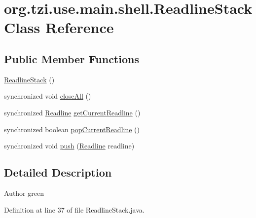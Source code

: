 \hypertarget{classorg_1_1tzi_1_1use_1_1main_1_1shell_1_1_readline_stack}{\section{org.\-tzi.\-use.\-main.\-shell.\-Readline\-Stack Class Reference}
\label{classorg_1_1tzi_1_1use_1_1main_1_1shell_1_1_readline_stack}
}
\subsection*{Public Member Functions}
\begin{DoxyCompactItemize}
\item 
\hyperlink{classorg_1_1tzi_1_1use_1_1main_1_1shell_1_1_readline_stack_a7762349b43ba2d854a9fc03502c673af}{Readline\-Stack} ()
\item 
synchronized void \hyperlink{classorg_1_1tzi_1_1use_1_1main_1_1shell_1_1_readline_stack_a517cc162314a1683865f2d2283bc1b4d}{close\-All} ()
\item 
synchronized \hyperlink{interfaceorg_1_1tzi_1_1use_1_1util_1_1input_1_1_readline}{Readline} \hyperlink{classorg_1_1tzi_1_1use_1_1main_1_1shell_1_1_readline_stack_ada96c1ca20a50243e0e843220d83bc56}{get\-Current\-Readline} ()
\item 
synchronized boolean \hyperlink{classorg_1_1tzi_1_1use_1_1main_1_1shell_1_1_readline_stack_a7775c9ef3731543fc28a3d7b625e299b}{pop\-Current\-Readline} ()
\item 
synchronized void \hyperlink{classorg_1_1tzi_1_1use_1_1main_1_1shell_1_1_readline_stack_acee8c24d05728e09a32f071135a1b139}{push} (\hyperlink{interfaceorg_1_1tzi_1_1use_1_1util_1_1input_1_1_readline}{Readline} readline)
\end{DoxyCompactItemize}


\subsection{Detailed Description}
\begin{DoxyAuthor}{Author}
green 
\end{DoxyAuthor}


Definition at line 37 of file Readline\-Stack.\-java.



